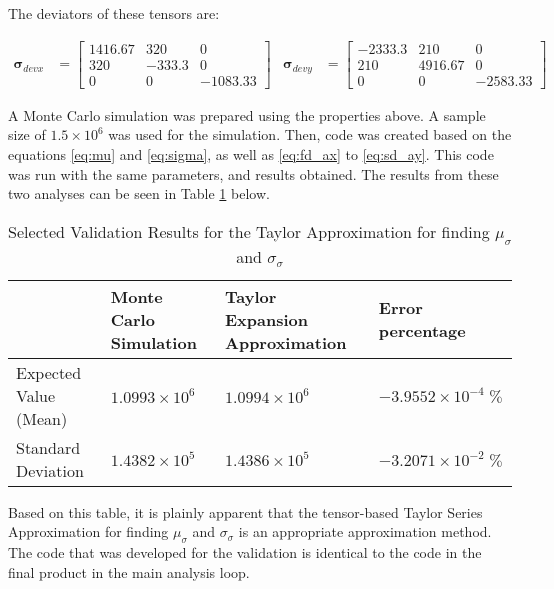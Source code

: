 The deviators of these tensors are: 

\begin{align*}
\mathbf{\sigma}_{devx} &= \left[ 
\begin{matrix}
1416.67 & 320 & 0\\
320 & -333.3 & 0\\
0 & 0 & -1083.33
\end{matrix}
\right]
&\mathbf{\sigma}_{devy} &= \left[
\begin{matrix}
-2333.3&210&0\\
210&4916.67&0\\
0&0&-2583.33
\end{matrix}
\right]
\end{align*}

A Monte Carlo simulation was prepared using the properties above. A sample size of $1.5\times 10^6$ was used for the simulation. Then, code was created based on the equations \ref{eq:mu} and \ref{eq:sigma}, as well as \ref{eq:fd_ax} to \ref{eq:sd_ay}. This code was run with the same parameters, and results obtained. The results from these two analyses can be seen in Table \ref{tab:val_tensors} below. 

\begin{table}[!hbtp]
\caption{Selected Validation Results for the Taylor Approximation for finding $\mu_\sigma$ and $\sigma_\sigma$}
\small
\label{tab:val_tensors}
\begin{center}
\begin{tabular}{|l|p{2.1cm}|p{2.5cm}|p{2.5cm}|}
\hline
& Monte Carlo Simulation & Taylor Expansion Approximation & Error percentage\\
\hline
Expected Value (Mean) & $1.0993 \times 10^6$ & $1.0994 \times 10^6$ & $-3.9552 \times 10^{-4} \;\%$\\
Standard Deviation & $1.4382 \times 10^5$ & $1.4386 \times 10^5$ & $-3.2071 \times 10^{-2} \;\%$\\
\hline
\end{tabular}
\end{center}
\end{table}

Based on this table, it is plainly apparent that the tensor-based Taylor Series Approximation for finding $\mu_\sigma$ and $\sigma_\sigma$ is an appropriate approximation method. The code that was developed for the validation is identical to the code in the final product in the main analysis loop. 
